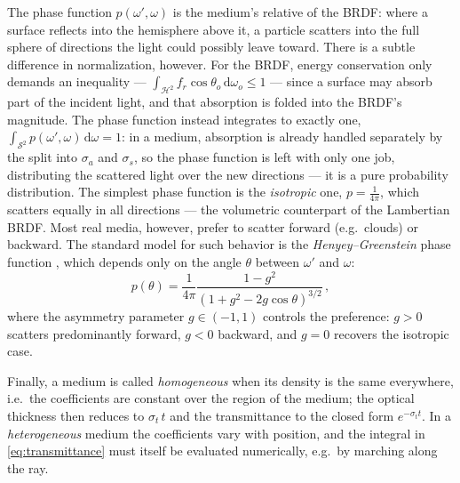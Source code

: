 The phase function $p(\omega', \omega)$ is the medium's relative of the BRDF: where a surface reflects into the hemisphere above it, a particle scatters into the full sphere of directions the light could possibly leave toward. There is a subtle difference in normalization, however. For the BRDF, energy conservation only demands an inequality --- $\int_{\mathcal{H}^2} f_r \cos\theta_o \,\mathrm{d}\omega_o \leq 1$ --- since a surface may absorb part of the incident light, and that absorption is folded into the BRDF's magnitude. The phase function instead integrates to exactly one, $\int_{\mathcal{S}^2} p(\omega', \omega) \,\mathrm{d}\omega = 1$: in a medium, absorption is already handled separately by the split into $\sigma_a$ and $\sigma_s$, so the phase function is left with only one job, distributing the scattered light over the new directions --- it is a pure probability distribution. The simplest phase function is the \emph{isotropic} one, $p = \frac{1}{4\pi}$, which scatters equally in all directions --- the volumetric counterpart of the Lambertian BRDF. Most real media, however, prefer to scatter forward (e.g.\ clouds) or backward. The standard model for such behavior is the \emph{Henyey--Greenstein} phase function \cite{henyey41}, which depends only on the angle $\theta$ between $\omega'$ and $\omega$:
\begin{equation}
	\label{eq:henyey_greenstein}
	p(\theta) = \frac{1}{4\pi} \frac{1 - g^2}{\left(1 + g^2 - 2g\cos\theta\right)^{3/2}} \,,
\end{equation}
where the asymmetry parameter $g \in (-1, 1)$ controls the preference: $g > 0$ scatters predominantly forward, $g < 0$ backward, and $g = 0$ recovers the isotropic case.

Finally, a medium is called \emph{homogeneous} when its density is the same everywhere, i.e.\ the coefficients are constant over the region of the medium; the optical thickness then reduces to $\sigma_t \, t$ and the transmittance to the closed form $e^{-\sigma_t t}$. In a \emph{heterogeneous} medium the coefficients vary with position, and the integral in \cref{eq:transmittance} must itself be evaluated numerically, e.g.\ by marching along the ray.

